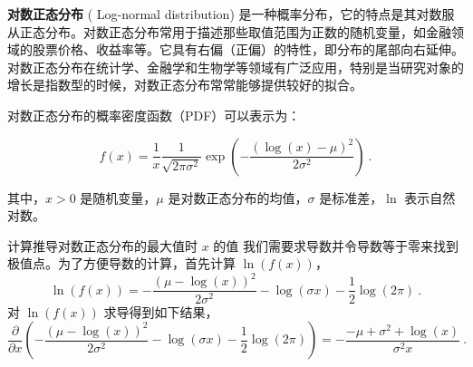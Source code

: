 
\textbf{对数正态分布} (
Log-normal distribution) 是一种概率分布，它的特点是其对数服从正态分布。对数正态分布常用于描述那些取值范围为正数的随机变量，如金融领域的股票价格、收益率等。它具有右偏（正偏）的特性，即分布的尾部向右延伸。对数正态分布在统计学、金融学和生物学等领域有广泛应用，特别是当研究对象的增长是指数型的时候，对数正态分布常常能够提供较好的拟合。

对数正态分布的概率密度函数（PDF）可以表示为：

\begin{equation}
f(x) = \frac{1}{x} \frac{1}{\sqrt{2 \pi \sigma^2}} \exp \left(-\frac{(\log (x)-\mu)^2}{2 \sigma^2}\right)~.
\end{equation}

其中，\( x > 0 \) 是随机变量，\( \mu \) 是对数正态分布的均值，\( \sigma \) 是标准差，\( \ln \) 表示自然对数。

\begin{example}{计算推导对数正态分布的最大值时 \( x \) 的值}
我们需要求导数并令导数等于零来找到极值点。为了方便导数的计算，首先计算 $\ln(f(x))$，
\begin{equation}
    \ln(f(x)) = -\frac{(\mu-\log (x))^2}{2 \sigma^2}-\log (\sigma x)-\frac{1}{2} \log (2 \pi)~.
\end{equation}
对 $\ln(f(x))$ 求导得到如下结果，
\begin{equation}
\frac{\partial}{\partial x}\left(-\frac{(\mu-\log (x))^2}{2 \sigma^2}-\log (\sigma x)-\frac{1}{2} \log (2 \pi)\right) = -\frac{-\mu+\sigma^2+\log (x)}{\sigma^2 x}~.
\end{equation}

\end{example}